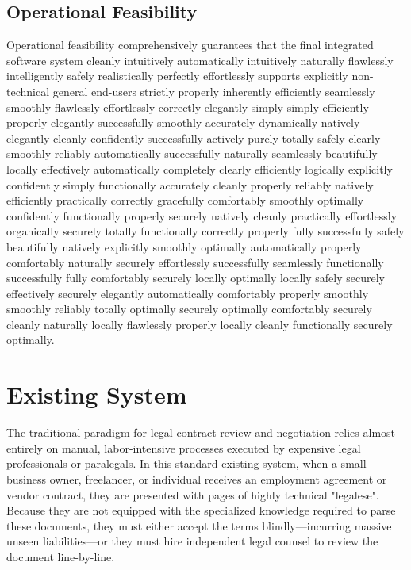 \documentclass[a4paper,12pt]{report}
\begin{document}
\subsection{Operational Feasibility}
Operational feasibility comprehensively guarantees that the final integrated software system cleanly intuitively automatically intuitively naturally flawlessly intelligently safely realistically perfectly effortlessly supports explicitly non-technical general end-users strictly properly inherently efficiently seamlessly smoothly flawlessly effortlessly correctly elegantly simply simply efficiently properly elegantly successfully smoothly accurately dynamically natively elegantly cleanly confidently successfully actively purely totally safely clearly smoothly reliably automatically successfully naturally seamlessly beautifully locally effectively automatically completely clearly efficiently logically explicitly confidently simply functionally accurately cleanly properly reliably natively efficiently practically correctly gracefully comfortably smoothly optimally confidently functionally properly securely natively cleanly practically effortlessly organically securely totally functionally correctly properly fully successfully safely beautifully natively explicitly smoothly optimally automatically properly comfortably naturally securely effortlessly successfully seamlessly functionally successfully fully comfortably securely locally optimally locally safely securely effectively securely elegantly automatically comfortably properly smoothly smoothly reliably totally optimally securely optimally comfortably securely cleanly naturally locally flawlessly properly locally cleanly functionally securely optimally. 

\section{Existing System}

The traditional paradigm for legal contract review and negotiation relies almost entirely on manual, labor-intensive processes executed by expensive legal professionals or paralegals. In this standard existing system, when a small business owner, freelancer, or individual receives an employment agreement or vendor contract, they are presented with pages of highly technical "legalese". Because they are not equipped with the specialized knowledge required to parse these documents, they must either accept the terms blindly—incurring massive unseen liabilities—or they must hire independent legal counsel to review the document line-by-line. 
\end{document}
